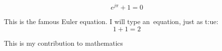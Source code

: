 \documentclass[a4paper]{article}
\begin{document}
\begin{equation} \label{euler}
e^{j \pi } + 1 = 0
\end{equation}

This is the famous Euler equation. I will type an\the\ equation, just as t:ue:
\begin{equation} \label{eqn:simple}
1 + 1 = 2
\end{equation}

This is my contribution to mathematics
\end{document}
